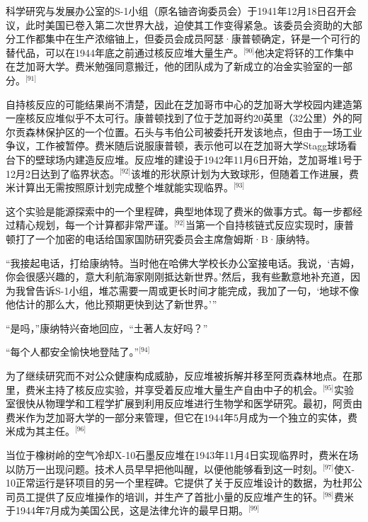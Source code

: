 科学研究与发展办公室的S-1小组（原名铀咨询委员会）于1941年12月18日召开会议，此时美国已卷入第二次世界大战，迫使其工作变得紧急。该委员会资助的大部分工作都集中在生产浓缩铀上，但委员会成员阿瑟·康普顿确定，钚是一个可行的替代品，可以在1944年底之前通过核反应堆大量生产。\(^\text{[90]}\)他决定将钚的工作集中在芝加哥大学。费米勉强同意搬迁，他的团队成为了新成立的冶金实验室的一部分。\(^\text{[91]}\)

自持核反应的可能结果尚不清楚，因此在芝加哥市中心的芝加哥大学校园内建造第一座核反应堆似乎不太可行。康普顿找到了位于芝加哥约20英里（32公里）外的阿尔贡森林保护区的一个位置。石头与韦伯公司被委托开发该地点，但由于一场工业争议，工作被暂停。费米随后说服康普顿，表示他可以在芝加哥大学Stagg球场看台下的壁球场内建造反应堆。反应堆的建设于1942年11月6日开始，芝加哥堆1号于12月2日达到了临界状态。\(^\text{[92]}\)该堆的形状原计划为大致球形，但随着工作进展，费米计算出无需按照原计划完成整个堆就能实现临界。\(^\text{[93]}\)

这个实验是能源探索中的一个里程碑，典型地体现了费米的做事方式。每一步都经过精心规划，每一个计算都非常严谨。\(^\text{[92]}\)当第一个自持核链式反应实现时，康普顿打了一个加密的电话给国家国防研究委员会主席詹姆斯·B·康纳特。

“我接起电话，打给康纳特。当时他在哈佛大学校长办公室接电话。我说，‘吉姆，你会很感兴趣的，意大利航海家刚刚抵达新世界。’然后，我有些歉意地补充道，因为我曾告诉S-1小组，堆芯需要一周或更长时间才能完成，我加了一句，‘地球不像他估计的那么大，他比预期更快到达了新世界。’”

“是吗，”康纳特兴奋地回应，“土著人友好吗？”

“每个人都安全愉快地登陆了。”\(^\text{[94]}\)

为了继续研究而不对公众健康构成威胁，反应堆被拆解并移至阿贡森林地点。在那里，费米主持了核反应实验，并享受着反应堆大量生产自由中子的机会。\(^\text{[95]}\)实验室很快从物理学和工程学扩展到利用反应堆进行生物学和医学研究。最初，阿贡由费米作为芝加哥大学的一部分来管理，但它在1944年5月成为一个独立的实体，费米成为其主任。\(^\text{[96]}\)

当位于橡树岭的空气冷却X-10石墨反应堆在1943年11月4日实现临界时，费米在场以防万一出现问题。技术人员早早把他叫醒，以便他能够看到这一时刻。\(^\text{[97]}\)使X-10正常运行是钚项目的另一个里程碑。它提供了关于反应堆设计的数据，为杜邦公司员工提供了反应堆操作的培训，并生产了首批小量的反应堆产生的钚。\(^\text{[98]}\)费米于1944年7月成为美国公民，这是法律允许的最早日期。\(^\text{[99]}\)

